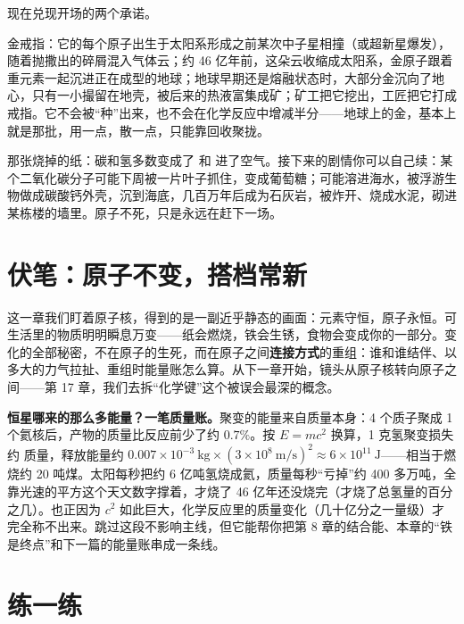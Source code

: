 现在兑现开场的两个承诺。

金戒指：它的每个原子出生于太阳系形成之前某次中子星相撞（或超新星爆发），随着抛撒出的碎屑混入气体云；约 46 亿年前，这朵云收缩成太阳系，金原子跟着重元素一起沉进正在成型的地球；地球早期还是熔融状态时，大部分金沉向了地心，只有一小撮留在地壳，被后来的热液富集成矿；矿工把它挖出，工匠把它打成戒指。它不会被“种”出来，也不会在化学反应中增减半分——地球上的金，基本上就是那批，用一点，散一点，只能靠回收聚拢。

那张烧掉的纸：碳和氢多数变成了  和  进了空气。接下来的剧情你可以自己续：某个二氧化碳分子可能下周被一片叶子抓住，变成葡萄糖；可能溶进海水，被浮游生物做成碳酸钙外壳，沉到海底，几百万年后成为石灰岩，被炸开、烧成水泥，砌进某栋楼的墙里。原子不死，只是永远在赶下一场。

\section{伏笔：原子不变，搭档常新}

这一章我们盯着原子核，得到的是一副近乎静态的画面：元素守恒，原子永恒。可生活里的物质明明瞬息万变——纸会燃烧，铁会生锈，食物会变成你的一部分。变化的全部秘密，不在原子的生死，而在原子之间\textbf{连接方式}的重组：谁和谁结伴、以多大的力气拉扯、重组时能量账怎么算。从下一章开始，镜头从原子核转向原子之间——第 17 章，我们去拆“化学键”这个被误会最深的概念。

\begin{tiaozhan}
\textbf{恒星哪来的那么多能量？一笔质量账。}聚变的能量来自质量本身：4 个质子聚成 1 个氦核后，产物的质量比反应前少了约 $0.7\%$。按 $E=mc^2$ 换算，1 克氢聚变损失约  质量，释放能量约 $0.007\times 10^{-3}\ \mathrm{kg}\times (3\times 10^{8}\ \mathrm{m/s})^2 \approx 6\times 10^{11}\ \mathrm{J}$——相当于燃烧约 20 吨煤。太阳每秒把约 6 亿吨氢烧成氦，质量每秒“亏掉”约 400 多万吨，全靠光速的平方这个天文数字撑着，才烧了 46 亿年还没烧完（才烧了总氢量的百分之几）。也正因为 $c^2$ 如此巨大，化学反应里的质量变化（几十亿分之一量级）才完全称不出来。跳过这段不影响主线，但它能帮你把第 8 章的结合能、本章的“铁是终点”和下一篇的能量账串成一条线。
\end{tiaozhan}

\section*{练一练}

